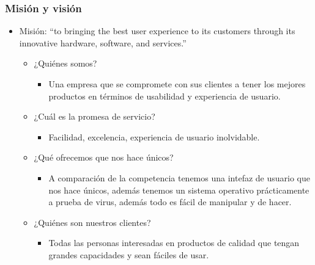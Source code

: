 \documentclass{article}
\begin{document}
\subsubsection{Misión y visión}
\begin{itemize}
    \item Misión: ``to bringing the best user experience to its customers through its innovative hardware, software, and services.''
        \begin{itemize}
            \item ¿Quiénes somos?
                \begin{itemize}
                    \item Una empresa que se compromete con sus clientes a tener los mejores productos en términos de usabilidad y experiencia de usuario.
                \end{itemize}
                
            \item ¿Cuál es la promesa de servicio?
                \begin{itemize}
                    \item Facilidad, excelencia, experiencia de usuario inolvidable.
                \end{itemize}
                
            \item ¿Qué ofrecemos que nos hace únicos?
                \begin{itemize}
                    \item A comparación de la competencia tenemos una intefaz de usuario que nos hace únicos, además tenemos un sistema operativo prácticamente a prueba de virus, además todo es fácil de manipular y de hacer.
                \end{itemize}
                
            \item ¿Quiénes son nuestros clientes?
                \begin{itemize}
                    \item Todas las personas interesadas en productos de calidad que tengan grandes capacidades y sean fáciles de usar.
                \end{itemize}
                
        \end{itemize}
    

\end{itemize}
\end{document}
